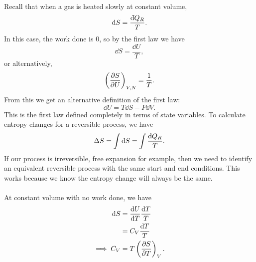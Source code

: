 \documentclass[../thermodynamics.tex]{subfiles}
\begin{document}
        \paragraph{}
        Recall that when a gas is heated slowly at constant volume,
        \begin{equation}
            \dd{S}=\frac{\dbar{Q}_R}{T}.
        \end{equation}
        In this case, the work done is 0, so by the first law we have
        \begin{equation}
            \dd{S}=\frac{\dd{U}}{T},
        \end{equation}
        or alternatively,
        \begin{equation}
            \left(\pdv{S}{U}\right)_{V,N}=\frac{1}{T}.
        \end{equation}
        From this we get an alternative definition of the first law:
        \begin{equation}
            \dd{U}=T\dd{S}-P\dd{V}.
        \end{equation}
        This is the first law defined completely in terms of state variables.
        To calculate entropy changes for a reversible process, we have
        \begin{equation}
            \Delta S=\int\dd{S}=\int\frac{\dbar{Q}_R}{T}.
        \end{equation}
        If our process is irreversible, free expansion for example, then we need to identify an equivalent reversible process with the same start and end conditions.
        This works because we know the entropy change will always be the same.

        \paragraph{}
        At constant volume with no work done, we have
        \begin{align}
            \dd{S}&=\dv{U}{T}\frac{\dd{T}}{T}\\
            &=C_V\frac{\dd{T}}{T}\\
            \implies C_V&=T\left(\pdv{S}{T}\right)_V.
        \end{align}
\end{document}
